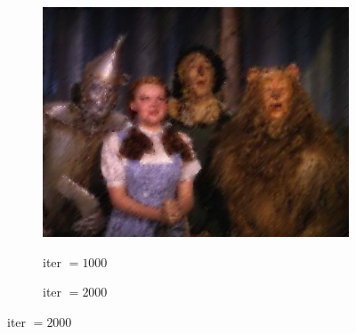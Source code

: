 \documentclass[paper=a4, fontsize=11pt]{scrartcl} %
\numberwithin{equation}{section} %
\numberwithin{figure}{section} %
\numberwithin{table}{section} %
\begin{document}
\begin{figure}[H]
\begin{subfigure}[b]{0.3\textwidth}
{		  \includegraphics[width=\textwidth]{inp1000.jpg}
		}
	\caption{iter $=1000$}
	\end{subfigure}
	\begin{subfigure}[b]{0.3\textwidth}
		\noindent{}
	\caption{iter $=2000$}
	\end{subfigure}
\end{figure}
\end{document}

